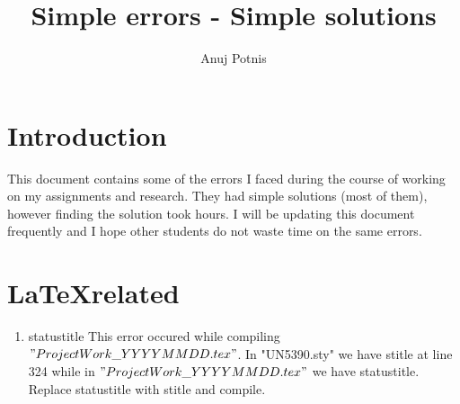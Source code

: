 \documentclass[12pt,letterpaper]{article}
\author{Anuj Potnis}
\title{Simple errors - Simple solutions}
\begin{document}
\maketitle
\section{Introduction}
This document contains some of the errors I faced during the course of working on my assignments and research. They had simple solutions (most of them), however finding the solution took hours. I will be updating this document frequently and I hope other students do not waste time on the same errors.

\section{\LaTeX \:related}
\begin{enumerate}
\item statustitle
This error occured while compiling $"ProjectWork\_YYYYMMDD.tex"$. In "UN5390.sty" we have stitle at line 324 while in $"ProjectWork\_YYYYMMDD.tex"$ we have statustitle. Replace statustitle with stitle and compile.
\end{enumerate}
\end{document}
